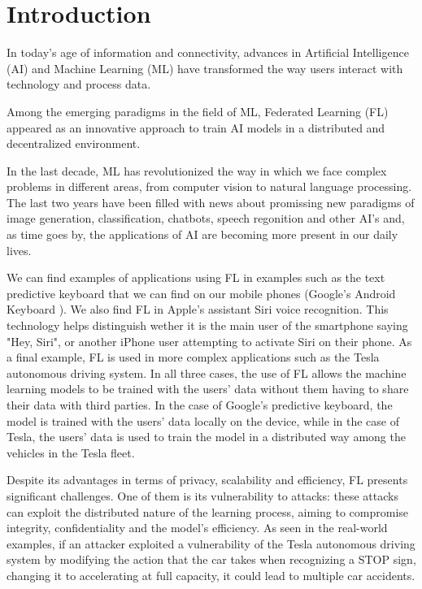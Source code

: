\section{Introduction}
In today's age of information and connectivity, advances in Artificial Intelligence (AI) and Machine Learning (ML) have transformed the way users interact with technology and process data.

Among the emerging paradigms in the field of ML, Federated Learning (FL) appeared as an innovative approach to train AI models in a distributed and decentralized environment.

In the last decade, ML has revolutionized the way in which we face complex problems in different areas, from computer vision to natural language processing. The last two years have been filled with news about promissing new paradigms of image generation, classification, chatbots, speech regonition and other AI's and, as time goes by, the applications of AI are becoming more present in our daily lives.

We can find examples of applications using FL in examples such as the text predictive keyboard that we can find on our mobile phones (Google's Android Keyboard \cite{GoogleKeyboard}). We also find FL in Apple's assistant Siri voice recognition. This technology  helps distinguish wether it is the main user of the smartphone saying "Hey, Siri", or another iPhone user attempting to activate Siri on their phone. As a final example, FL is used in more complex applications such as the Tesla autonomous driving system. In all three cases, the use of FL allows the machine learning models to be trained with the users' data without them having to share their data with third parties. In the case of Google's predictive keyboard, the model is trained with the users' data locally on the device, while in the case of Tesla, the users' data is used to train the model in a distributed way among the vehicles in the Tesla fleet.

Despite its advantages in terms of privacy, scalability and efficiency, FL presents significant challenges. One of them is its vulnerability to attacks: these attacks can exploit the distributed nature of the learning process, aiming to compromise integrity, confidentiality and the model's efficiency. As seen in the real-world examples, if an attacker exploited a vulnerability of the Tesla autonomous driving system by modifying the action that the car takes when recognizing a STOP sign, changing it to accelerating at full capacity, it could lead to multiple car accidents.

